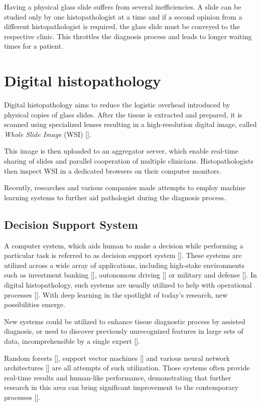 Having a physical glass slide suffers from several inefficiencies. A slide can be studied only by one histopathologist at a time and if a second opinion from a different histopathologist is required, the glass slide must be conveyed to the respective clinic. This throttles the diagnosis process and leads to longer waiting times for a patient.

\section{Digital histopathology}

Digital histopathology aims to reduce the logistic overhead introduced by physical copies of glass slides. After the tissue is extracted and prepared, it is scanned using specialized lenses resulting in a high-resolution digital image, called \emph{Whole Slide Image} (WSI) [].

This image is then uploaded to an aggregator server, which enable real-time sharing of slides and parallel cooperation of multiple clinicians. Histopathologists then inspect WSI in a dedicated browsers on their computer monitors.

Recently, researches and various companies made attempts to employ machine learning systems to further aid pathologist during the diagnosis process. 

\subsection*{Decision Support System}

A computer system, which aids human to make a decision while performing a particular task is referred to as decision support system []. These systems are utilized across a wide array of applications, including high-stake environments such as investment banking [], autonomous driving [] or military and defense []. In digital histopathology, such systems are usually utilized to help with operational processes []. With deep learning in the spotlight of today's research, new possibilities emerge.

New systems could be utilized to enhance tissue diagnostic process by assisted diagnosis, or used to discover previously unrecognized features in large sets of data, incomprehensible by a single expert [].


Random forests [], support vector machines [] and various neural network architectures [] are all attempts of such utilization. Those systems often provide real-time results and human-like performance, demonstrating that further research in this area can bring significant improvement to the contemporary processes [].

